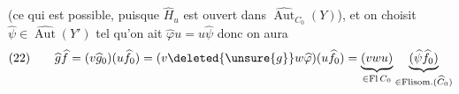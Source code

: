(ce qui est possible, puisque $\widehat H_u$ est ouvert dans $\widehat{\operatorname{Aut}}_{C_0}(Y)$),
et on choisit $\widehat\psi\in\widehat{\operatorname{Aut}}(Y')$ tel qu'on ait $\widehat\varphi u=u\widehat\psi$
donc on aura
\[
(22)\qquad\widehat g\widehat f=(v\widehat g_0)(u\widehat f_0)
=(v\deleted{\unsure{g}}w\widehat\varphi)(u\widehat f_0)
=\underbrace{(vwu)}_{\in\mathrm{Fl}\,C_0}\underbrace{(\widehat\psi\widehat f_0)}_{\in\mathrm{Flisom.}(\widehat C_0)}
\]
